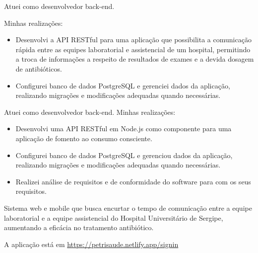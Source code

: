 \documentclass[10pt,a4paper,ragged2e,withhyper]{altacv}
\begin{document}
\begin{paracol}{2}
\par\divider
{}

Atuei como desenvolvedor back-end.

Minhas realizações:
\begin{itemize}
\item Desenvolvi a API RESTful para uma aplicação que possibilita a comunicação rápida entre as equipes laboratorial e assistencial de um hospital, permitindo a troca de informações a respeito de resultados de exames e a devida dosagem de antibióticos.
\item Configurei banco de dados PostgreSQL e gerenciei dados da aplicação, realizando migrações e modificações adequadas quando necessárias.
\end{itemize}


\newpage

\par\divider
{}

Atuei como desenvolvedor back-end. Minhas realizações:
\begin{itemize}
\item Desenvolvi uma API RESTful em Node.js como componente para uma aplicação de fomento ao consumo consciente.
\item Configurei banco de dados PostgreSQL e gerenciou dados da aplicação, realizando migrações e modificações adequadas quando necessárias.
\item Realizei análise de requisitos e de conformidade do software para com os seus requisitos.
\end{itemize}

\newpage
\switchcolumn
{}
\label{sec:orgefac9da}

Sistema web e mobile que busca encurtar o tempo de comunicação entre a equipe laboratorial e a equipe assistencial do Hospital Universitário de Sergipe, aumentando a eficácia no tratamento antibiótico.

A aplicação está em \url{https://petrisaude.netlify.app/signin}


\end{paracol}
\end{document}
